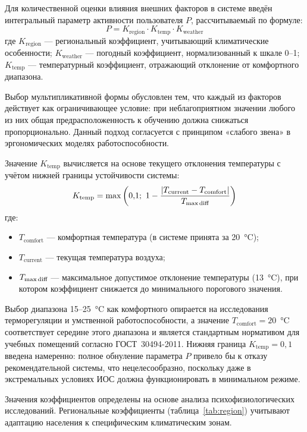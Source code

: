 Для количественной оценки влияния внешних факторов в системе введён интегральный параметр активности пользователя $P$, рассчитываемый по формуле:
\begin{equation}
    \label{eq:P}
    P = K_{\text{region}} \cdot K_{\text{temp}} \cdot K_{\text{weather}}
\end{equation}
где $K_{\text{region}}$ --- региональный коэффициент, учитывающий климатические особенности; $K_{\text{weather}}$ --- погодный коэффициент, нормализованный к шкале 0--1; $K_{\text{temp}}$ --- температурный коэффициент, отражающий отклонение от комфортного диапазона.

Выбор мультипликативной формы обусловлен тем, что каждый из факторов 
действует как ограничивающее условие: при неблагоприятном значении 
любого из них общая предрасположенность к обучению должна снижаться 
пропорционально. Данный подход согласуется с принципом «слабого 
звена» в эргономических моделях работоспособности.

Значение $K_{\text{temp}}$ вычисляется на основе текущего отклонения температуры с учётом нижней границы устойчивости системы:
\begin{equation}
    \label{eq:Ktemp}
    K_{\text{temp}} = \max\left(0{,}1;\ 1 - \frac{|T_{\text{current}} - T_{\text{comfort}}|}{T_{\text{max\,diff}}}\right)
\end{equation}
где:
\begin{itemize}
    \item $T_{\text{comfort}}$ --- комфортная температура (в системе принята за 20~°C);
    \item $T_{\text{current}}$ --- текущая температура воздуха;
    \item $T_{\text{max\,diff}}$ --- максимальное допустимое отклонение температуры (13~°C), при котором коэффициент снижается до минимального порогового значения.
\end{itemize}

Выбор диапазона 15--25~°C как комфортного опирается на исследования терморегуляции и умственной работоспособности, а значение $T_{\text{comfort}} = 20$~°C соответствует середине этого диапазона и является стандартным нормативом для учебных помещений согласно ГОСТ~30494-2011. Нижняя граница $K_{\text{temp}} = 0{,}1$ введена намеренно: полное обнуление параметра $P$ привело бы к отказу рекомендательной системы, что нецелесообразно, поскольку даже в экстремальных условиях ИОС должна функционировать в минимальном режиме.

Значения коэффициентов определены на основе анализа психофизиологических исследований. Региональные коэффициенты (таблица~\ref{tab:region}) учитывают адаптацию населения к специфическим климатическим зонам.

